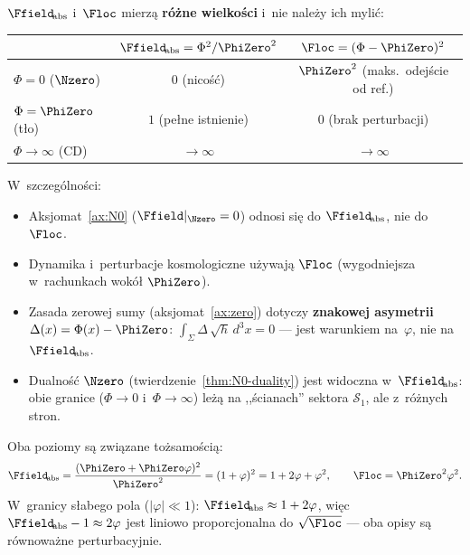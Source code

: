 \begin{remark}\label{rem:F-dwa-poziomy}
$\Ffield_{\!\mathrm{abs}}$ i~$\Floc$ mierz\k{a} \textbf{r\'o\.zne
wielko\'sci} i~nie nale\.zy ich myli\'c:
\begin{center}
\begin{tabular}{lcc}
\toprule
& $\Ffield_{\!\mathrm{abs}} = \Phi^2/\PhiZero^2$ & $\Floc = (\Phi-\PhiZero)^2$ \\
\midrule
$\Phi = 0$ ($\Nzero$) & $0$ (nico\'s\'c) & $\PhiZero^2$ (maks.\ odej\'scie od ref.) \\
$\Phi = \PhiZero$ (t\l{}o) & $1$ (pe\l{}ne istnienie) & $0$ (brak perturbacji) \\
$\Phi \to \infty$ (CD) & $\to\infty$ & $\to\infty$ \\
\bottomrule
\end{tabular}
\end{center}
W~szczeg\'olno\'sci:
\begin{itemize}[nosep]
  \item Aksjomat~\ref{ax:N0} ($\Ffield|_{\Nzero} = 0$) odnosi
    si\k{e} do $\Ffield_{\!\mathrm{abs}}$, nie do $\Floc$.
  \item Dynamika i~perturbacje kosmologiczne u\.zywaj\k{a} $\Floc$
    (wygodniejsza w~rachunkach wok\'o\l{} $\PhiZero$).
  \item Zasada zerowej sumy (aksjomat~\ref{ax:zero}) dotyczy
    \textbf{znakowej asymetrii} $\Delta(x) = \Phi(x) - \PhiZero$:
    $\int_\Sigma \Delta\,\sqrt{h}\,d^3x = 0$ --- jest
    warunkiem na~$\varphi$, nie na~$\Ffield_{\!\mathrm{abs}}$.
  \item Dualno\'s\'c $\Nzero$ (twierdzenie~\ref{thm:N0-duality})
    jest widoczna w~$\Ffield_{\!\mathrm{abs}}$: obie granice
    ($\Phi \to 0$ i~$\Phi \to \infty$) le\.z\k{a} na ,,\'scianach''
    sektora $\mathcal{S}_1$, ale z~r\'o\.znych stron.
\end{itemize}
Oba poziomy s\k{a} zwi\k{a}zane to\.zsamo\'sci\k{a}:
\begin{equation}\label{eq:F-relation}
    \Ffield_{\!\mathrm{abs}}
    = \frac{(\PhiZero + \PhiZero\varphi)^2}{\PhiZero^2}
    = (1 + \varphi)^2
    = 1 + 2\varphi + \varphi^2,
    \qquad
    \Floc = \PhiZero^2\varphi^2.
\end{equation}
W~granicy s\l{}abego pola ($|\varphi| \ll 1$):
$\Ffield_{\!\mathrm{abs}} \approx 1 + 2\varphi$, wi\k{e}c
$\Ffield_{\!\mathrm{abs}} - 1 \approx 2\varphi$ jest liniowo
proporcjonalna do $\sqrt{\Floc}$ --- oba opisy s\k{a} r\'ownowa\.zne
perturbacyjnie.
\end{remark}

